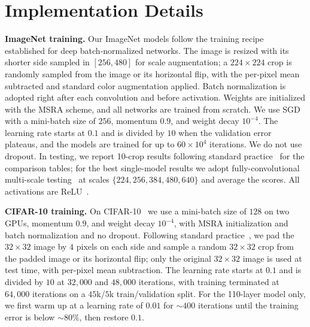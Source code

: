 \section{Implementation Details}
\label{app:impl}

\noindent\textbf{ImageNet training.}
Our ImageNet models follow the training recipe established for deep
batch-normalized networks. The image is resized with its shorter side sampled in
$[256, 480]$ for scale augmentation; a $224\times224$ crop is randomly sampled
from the image or its horizontal flip, with the per-pixel mean subtracted and
standard color augmentation applied. Batch normalization is adopted right after
each convolution and before activation. Weights are initialized with the MSRA
scheme, and all networks are trained from scratch. We use SGD with a mini-batch
size of $256$, momentum $0.9$, and weight decay $10^{-4}$. The learning rate
starts at $0.1$ and is divided by $10$ when the validation error plateaus, and
the models are trained for up to $60\times10^{4}$ iterations. We do not use
dropout. In testing, we report 10-crop results following standard
practice~\cite{alexnet2012} for the comparison tables; for the best single-model
results we adopt fully-convolutional multi-scale testing~\cite{vgg2015,overfeat2014,fcn2015}
at scales $\{224, 256, 384, 480, 640\}$ and average the scores. All activations
are ReLU~\cite{relu2010}.

\noindent\textbf{CIFAR-10 training.}
On CIFAR-10~\cite{cifar2009} we use a mini-batch size of $128$ on two GPUs, momentum $0.9$, and
weight decay $10^{-4}$, with MSRA initialization and batch normalization and no
dropout. Following standard practice~\cite{dsn2014}, we pad the $32\times32$ image by $4$ pixels
on each side and sample a random $32\times32$ crop from the padded image or its
horizontal flip; only the original $32\times32$ image is used at test time, with
per-pixel mean subtraction. The learning rate starts at $0.1$ and is divided by
$10$ at $32{,}000$ and $48{,}000$ iterations, with training terminated at
$64{,}000$ iterations on a $45$k/$5$k train/validation split. For the 110-layer
model only, we first warm up at a learning rate of $0.01$ for $\sim 400$
iterations until the training error is below $\sim 80\%$, then restore $0.1$.

